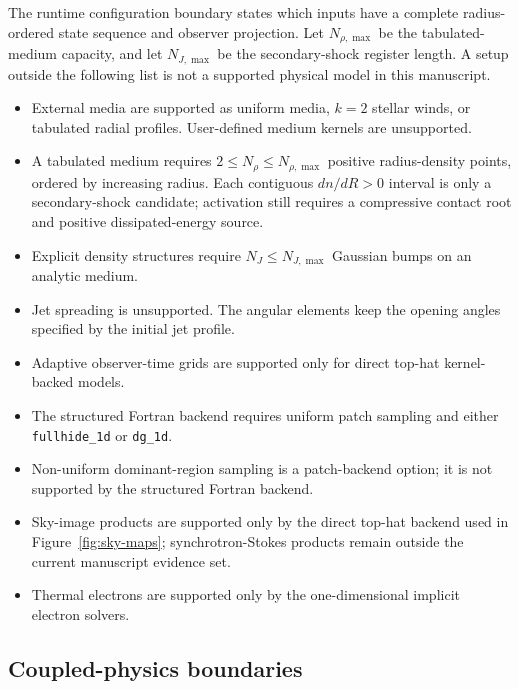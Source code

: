 \documentclass[twocolumn]{aastex702}
\begin{document}
The runtime configuration boundary states which inputs have a complete
radius-ordered state sequence and observer projection.  Let \(N_{\rho,\max}\) be
the tabulated-medium capacity, and let \(N_{J,\max}\) be the secondary-shock
register length.  A setup outside the following list is not a supported physical
model in this manuscript.
\begin{itemize}
\item External media are supported as uniform media, \(k=2\) stellar winds, or
tabulated radial profiles.  User-defined medium kernels are unsupported.
\item A tabulated medium requires \(2\le N_\rho\le N_{\rho,\max}\) positive
radius-density points, ordered by increasing radius.  Each contiguous
\(dn/dR>0\) interval is only a secondary-shock candidate; activation still
requires a compressive contact root and positive dissipated-energy source.
\item Explicit density structures require \(N_J\le N_{J,\max}\) Gaussian bumps
on an analytic medium.
\item Jet spreading is unsupported.  The angular elements keep the opening
angles specified by the initial jet profile.
\item Adaptive observer-time grids are supported only for direct top-hat
kernel-backed models.
\item The structured Fortran backend requires uniform patch sampling and either
\texttt{fullhide\_1d} or \texttt{dg\_1d}.
\item Non-uniform dominant-region sampling is a patch-backend option; it is not
supported by the structured Fortran backend.
\item Sky-image products are supported only by the direct top-hat backend used
in Figure~\ref{fig:sky-maps}; synchrotron-Stokes products remain outside the
current manuscript evidence set.
\item Thermal electrons are supported only by the one-dimensional implicit
electron solvers.
\end{itemize}

\subsection{Coupled-physics boundaries}
\end{document}
